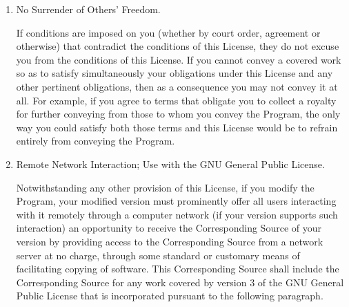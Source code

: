 \documentclass[10pt,a4paper,ngerman,titlepage,tocindentauto]{article}
\begin{document}
\begin{multicols}{3}
{\begin{enumerate}
						A patent license is ``discriminatory'' if it does not include within
						the scope of its coverage, prohibits the exercise of, or is
						conditioned on the non-exercise of one or more of the rights that are
						specifically granted under this License.  You may not convey a covered
						work if you are a party to an arrangement with a third party that is
						in the business of distributing software, under which you make payment
						to the third party based on the extent of your activity of conveying
						the work, and under which the third party grants, to any of the
						parties who would receive the covered work from you, a discriminatory
						patent license (a) in connection with copies of the covered work
						conveyed by you (or copies made from those copies), or (b) primarily
						for and in connection with specific products or compilations that
						contain the covered work, unless you entered into that arrangement,
						or that patent license was granted, prior to 28 March 2007.

						Nothing in this License shall be construed as excluding or limiting
						any implied license or other defenses to infringement that may
						otherwise be available to you under applicable patent law.

						\item No Surrender of Others' Freedom.

						If conditions are imposed on you (whether by court order, agreement or
						otherwise) that contradict the conditions of this License, they do not
						excuse you from the conditions of this License.  If you cannot convey a
						covered work so as to satisfy simultaneously your obligations under this
						License and any other pertinent obligations, then as a consequence you may
						not convey it at all.  For example, if you agree to terms that obligate you
						to collect a royalty for further conveying from those to whom you convey
						the Program, the only way you could satisfy both those terms and this
						License would be to refrain entirely from conveying the Program.

						\item Remote Network Interaction; Use with the GNU General Public License.

						Notwithstanding any other provision of this License, if you modify the
						Program, your modified version must prominently offer all users interacting
						with it remotely through a computer network (if your version supports such
						interaction) an opportunity to receive the Corresponding Source of your
						version by providing access to the Corresponding Source from a network
						server at no charge, through some standard or customary means of
						facilitating copying of software.  This Corresponding Source shall include
						the Corresponding Source for any work covered by version 3 of the GNU
						General Public License that is incorporated pursuant to the following
						paragraph.


\end{enumerate}}
\end{multicols}
\end{document}
